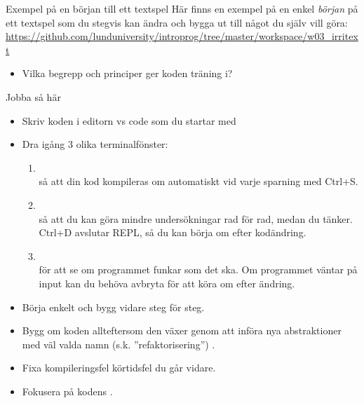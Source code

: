 \begin{SlideExtra}{Exempel på en början till ett textspel}
  Här finns en exempel på en enkel \emph{början} på ett textspel som du stegvis kan ändra och bygga ut till något du själv vill göra:
  \url{https://github.com/lunduniversity/introprog/tree/master/workspace/w03_irritext}

\begin{itemize}
  \item Vilka begrepp och principer ger koden träning i?
\end{itemize}

\end{SlideExtra}

\begin{SlideExtra}{Jobba så här}
\begin{itemize}\SlideFontSmall
  \item Skriv koden i editorn vs code som du startar med 
  \item Dra igång 3 olika terminalfönster:
  \begin{enumerate}\SlideFontTiny
  \item {}~\\så att din kod kompileras om automatiskt vid varje sparning med Ctrl+S.
  \item {}~\\så att du kan göra mindre undersökningar rad för rad, medan du tänker. Ctrl+D avslutar REPL, så du kan börja om efter kodändring.
  \item {}~\\för att se om programmet funkar som det ska. Om programmet väntar på input kan du behöva avbryta för att köra om efter ändring. 
  \end{enumerate}
  \item Börja enkelt och bygg vidare steg för steg.
  \item Bygg om koden allteftersom den växer genom att införa nya abstraktioner med väl valda namn (s.k. ''refaktorisering'') .
  \item Fixa  kompileringsfel \code{||} körtidsfel  du går vidare.
  \item Fokusera på kodens .
\end{itemize}

\end{SlideExtra}

\fi
